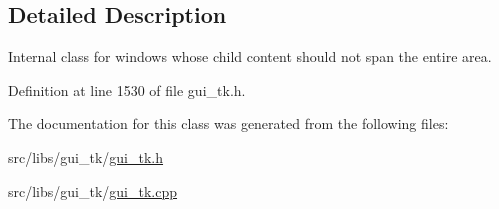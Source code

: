 \subsection{Detailed Description}
Internal class for windows whose child content should not span the entire area. 

Definition at line 1530 of file gui\-\_\-tk.\-h.



The documentation for this class was generated from the following files\-:\begin{DoxyCompactItemize}
\item 
src/libs/gui\-\_\-tk/\hyperlink{gui__tk_8h}{gui\-\_\-tk.\-h}\item 
src/libs/gui\-\_\-tk/\hyperlink{gui__tk_8cpp}{gui\-\_\-tk.\-cpp}\end{DoxyCompactItemize}
